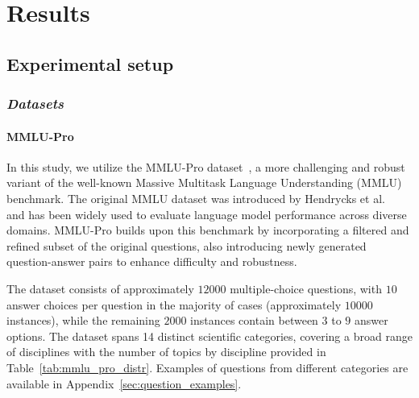 \section{Results}

\subsection{Experimental setup}

\subsubsection{\emph{Datasets}}

\paragraph{MMLU-Pro}
In this study, we utilize the MMLU-Pro dataset~\cite{wang2025mmlu}, a more challenging and robust variant of the well-known Massive Multitask Language Understanding (MMLU) benchmark. The original MMLU dataset was introduced by Hendrycks et al.~\cite{hendrycks2020measuring} and has been widely used to evaluate language model performance across diverse domains. MMLU-Pro builds upon this benchmark by incorporating a filtered and refined subset of the original questions, also introducing newly generated question-answer pairs to enhance difficulty and robustness.

The dataset consists of approximately $12000$ multiple-choice questions, with $10$ answer choices per question in the majority of cases (approximately $ 10000$ instances), while the remaining $ 2000$ instances contain between $3$ to $9$ answer options. 
The dataset spans 14 distinct scientific categories, covering a broad range of disciplines with the number of topics by discipline provided in Table~\ref{tab:mmlu_pro_distr}.
Examples of questions from different categories are available in Appendix~\ref{sec:question_examples}.


